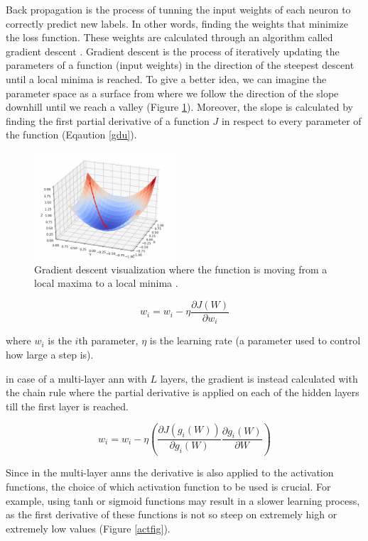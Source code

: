 \documentclass[runningheads]{llncs}
\begin{document}
Back propagation is the process of tunning the input weights of each 
neuron to correctly predict new labels. In other words,
finding the weights that minimize the loss function. These weights are calculated through
an algorithm called gradient descent \cite{lemarechal2012cauchy}. Gradient descent is the process of iteratively updating
the parameters of a function (input weights) in the direction of the steepest descent until a local minima is reached.
To give a better idea, we can imagine the parameter space as a surface from where we follow
the direction of the slope downhill until we reach a valley (Figure \ref{gd}).
Moreover, the slope is calculated by finding the first partial derivative of a function $J$ in respect to every parameter of the function (Eqaution \ref{gdu}). 

\begin{figure}[H]
    \label{gd}
    \centering
    \includegraphics[height=4cm]{gd}
    \caption{Gradient descent visualization where the function is moving from a local maxima to a local minima \cite{gdwiki}.}
\end{figure}

\begin{equation}
    \label{gdu}
w_{i} = w_{i} - \eta \frac{\partial J(W)}{\partial w_{i}}
\end{equation}

where $w_{i}$ is the $i$th parameter, $\eta$ is the learning rate (a parameter used to control how large a step is).

in case of a multi-layer \gls{ann} with $L$ layers, the gradient is instead calculated 
with the chain rule where the partial derivative is applied on each of the hidden layers
till the first layer is reached.

\begin{equation}
    \label{gdu}
w_{i} = w_{i} - \eta (\frac{\partial J(g_{i}(W))}{\partial g_{i}(W)}\frac{\partial g_{i}(W)}{\partial W})
\end{equation}

Since in the multi-layer \gls{anns} the derivative is also applied to the activation functions,
the choice of which activation function to be used is crucial. For example, using 
tanh or sigmoid functions may result in a slower learning process, as the first derivative of these functions
is not so steep on extremely high or extremely low values (Figure \ref{actfig}).
\end{document}
